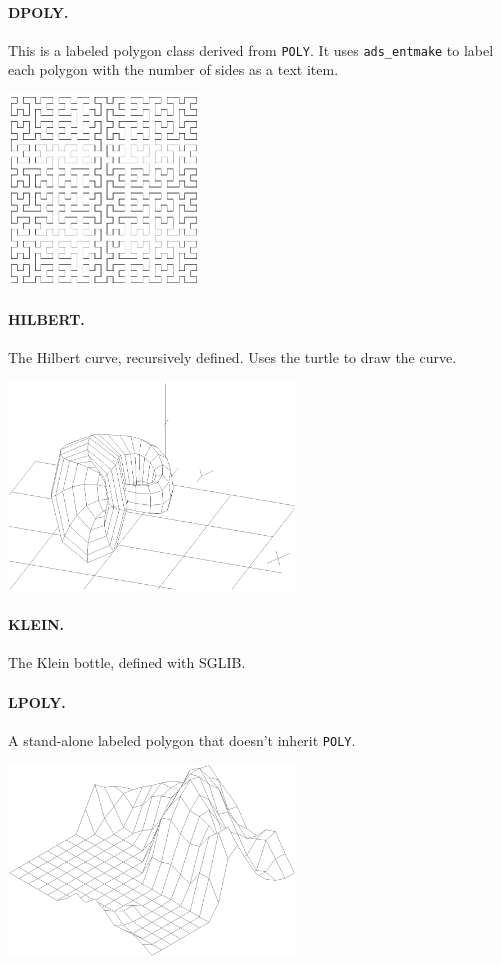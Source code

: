 \documentclass{article}
\begin{document}
\paragraph{DPOLY.}  This is a labeled polygon class derived from {\tt POLY}\@.
                It uses \verb+ads_entmake+ to label each polygon with the
                number of sides as a text item.

\centerline{\includegraphics[width=2in]{cwfig8.eps}}
\paragraph{HILBERT.}  The Hilbert curve, recursively defined.  Uses the
                turtle to draw the curve.

\centerline{\includegraphics[width=3in]{cwfig4.eps}}
\paragraph{KLEIN.}  The Klein bottle, defined with SGLIB.

\paragraph{LPOLY.}  A stand-alone labeled polygon that doesn't inherit
                {\tt POLY}.

\centerline{\includegraphics[width=3in]{cwfig9.eps}}
\end{document}
